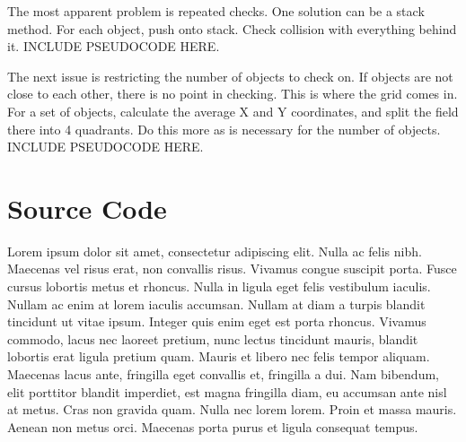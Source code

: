 \documentclass[12pt]{article}
\begin{document}
      The most apparent problem is repeated checks. One solution can be a stack method. For each object, push onto stack. Check collision with everything behind it. INCLUDE PSEUDOCODE HERE.

      The next issue is restricting the number of objects to check on. If objects are not close to each other, there is no point in checking. This is where the grid comes in. For a set of objects, calculate the average X and Y coordinates, and split the field there into 4 quadrants. Do this more as is necessary for the number of objects. INCLUDE PSEUDOCODE HERE.

  \section{Source Code}
    Lorem ipsum dolor sit amet, consectetur adipiscing elit. Nulla ac felis nibh. Maecenas vel risus erat, non convallis risus. Vivamus congue suscipit porta. Fusce cursus lobortis metus et rhoncus. Nulla in ligula eget felis vestibulum iaculis. Nullam ac enim at lorem iaculis accumsan. Nullam at diam a turpis blandit tincidunt ut vitae ipsum. Integer quis enim eget est porta rhoncus. Vivamus commodo, lacus nec laoreet pretium, nunc lectus tincidunt mauris, blandit lobortis erat ligula pretium quam. Mauris et libero nec felis tempor aliquam. Maecenas lacus ante, fringilla eget convallis et, fringilla a dui. Nam bibendum, elit porttitor blandit imperdiet, est magna fringilla diam, eu accumsan ante nisl at metus. Cras non gravida quam. Nulla nec lorem lorem. Proin et massa mauris. Aenean non metus orci. Maecenas porta purus et ligula consequat tempus.
\end{document}
